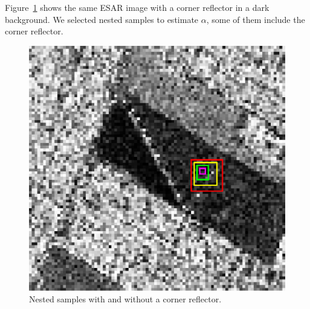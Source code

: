 \documentclass[twocolumn]{svjour3}
\begin{document}

Figure~\ref{CornerReflector} shows the same ESAR image with a corner reflector in a dark background. 
We selected nested samples to estimate $\alpha$, some of them include the corner reflector.

\begin{figure}[hbt]
	\centering
	\includegraphics[width=0.7\linewidth]{../../../Figures/PaperTesis/CornerJulia_Roja.eps}
	\caption{Nested samples with and without a corner reflector.}\label{CornerReflector}
\end{figure}
\end{document}
